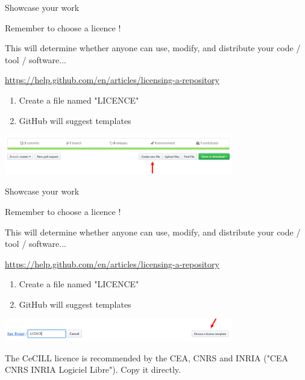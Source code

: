\begin{frame}{Showcase your work}

Remember to choose a licence !

This will determine whether anyone can use, modify, and distribute your code / tool / software...

\begin{center}
\url{https://help.github.com/en/articles/licensing-a-repository}
\end{center}

\begin{enumerate}
    \item Create a file named "LICENCE"
    \item GitHub will suggest templates
\end{enumerate}

\begin{center}
    \includegraphics[width=10cm]{08_sharing/images/github_new_file.png}
\end{center}

\end{frame}

\begin{frame}{Showcase your work}

Remember to choose a licence !

This will determine whether anyone can use, modify, and distribute your code / tool / software...

\begin{center}
\url{https://help.github.com/en/articles/licensing-a-repository}
\end{center}

\begin{enumerate}
    \item Create a file named "LICENCE"
    \item GitHub will suggest templates
\end{enumerate}

\begin{center}
    \includegraphics[width=10cm]{08_sharing/images/github_licence.png}
\end{center}

The CeCILL licence is recommended by the CEA, CNRS and INRIA ("CEA CNRS INRIA Logiciel Libre"). Copy it directly.
\end{frame}

